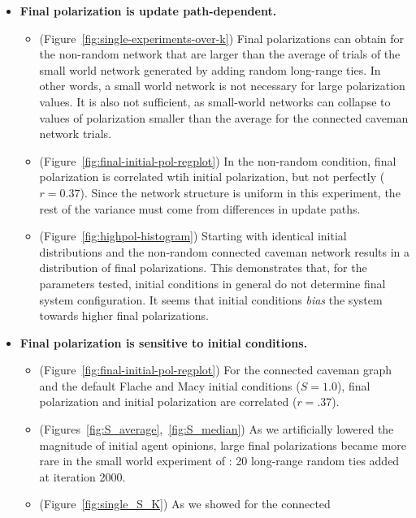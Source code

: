 \documentclass[11pt,letterpaper]{article}
\begin{document}
\begin{itemize}
  \item \textbf{Final polarization is update path-dependent.}
    \begin{itemize}
      \item (Figure~\ref{fig:single-experiments-over-k})
        Final polarizations can obtain for the non-random network that
        are larger than the average of trials of the small world network
        generated by adding random long-range ties. In other words, a
        small world network is not necessary for large polarization values.
        It is also not sufficient, as small-world networks can collapse to
        values of polarization smaller than the average for the connected
        caveman network trials. 
      \item (Figure~\ref{fig:final-initial-pol-regplot}) In the non-random
        condition, final polarization is correlated wtih initial polarization,
        but not perfectly ($r=0.37$). Since the network structure is uniform in this
        experiment, the rest of the variance must come from differences in 
        update paths.
      \item (Figure~\ref{fig:highpol-histogram}) 
        Starting with identical initial distributions
        and the non-random connected caveman network results in a distribution
        of final polarizations. This demonstrates that, for the parameters
        tested, initial conditions in general do not determine final system
        configuration. It seems that initial conditions \emph{bias} the system
        towards higher final polarizations.
    \end{itemize}
  \item \textbf{Final polarization is sensitive to initial conditions.}    
    \begin{itemize}
      \item (Figure~\ref{fig:final-initial-pol-regplot}) For the connected 
        caveman graph and the default Flache and Macy initial conditions ($S=1.0$),
        final polarization and initial polarization are 
        correlated ($r=.37$). 
      \item (Figures~\ref{fig:S_average},~\ref{fig:S_median}) 
        As we artificially lowered the magnitude of 
        initial agent opinions, large final polarizations became more rare
        in the small world experiment of : 
        20 long-range random ties added at iteration 2000.
      \item (Figure~\ref{fig:single_S_K}) As we showed for the connected 

\end{itemize}
\end{itemize}
\end{document}
